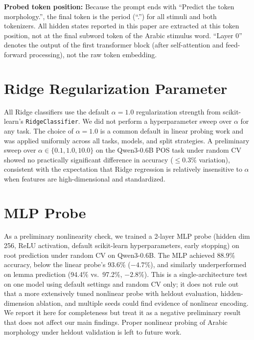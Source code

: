 \documentclass[11pt,a4paper]{article}
\begin{document}
\textbf{Probed token position:} Because the prompt ends with ``Predict the token morphology.'', the final token is the period (``.'') for all stimuli and both tokenizers. All hidden states reported in this paper are extracted at this token position, not at the final subword token of the Arabic stimulus word. ``Layer 0'' denotes the output of the first transformer block (after self-attention and feed-forward processing), not the raw token embedding.

\section{Ridge Regularization Parameter}\label{sec:appendix-alpha}
All Ridge classifiers use the default $\alpha=1.0$ regularization strength from scikit-learn's \texttt{RidgeClassifier}. We did not perform a hyperparameter sweep over $\alpha$ for any task. The choice of $\alpha=1.0$ is a common default in linear probing work and was applied uniformly across all tasks, models, and split strategies. A preliminary sweep over $\alpha \in \{0.1, 1.0, 10.0\}$ on the Qwen3-0.6B POS task under random CV showed no practically significant difference in accuracy ($\leq 0.3\%$ variation), consistent with the expectation that Ridge regression is relatively insensitive to $\alpha$ when features are high-dimensional and standardized.

\section{MLP Probe}\label{sec:appendix-mlp}
As a preliminary nonlinearity check, we trained a 2-layer MLP probe (hidden dim 256, ReLU activation, default scikit-learn hyperparameters, early stopping) on root prediction under random CV on Qwen3-0.6B. The MLP achieved 88.9\% accuracy, below the linear probe's 93.6\% ($-4.7\%$), and similarly underperformed on lemma prediction (94.4\% vs.\ 97.2\%, $-2.8\%$). This is a single-architecture test on one model using default settings and random CV only; it does not rule out that a more extensively tuned nonlinear probe with heldout evaluation, hidden-dimension ablation, and multiple seeds could find evidence of nonlinear encoding. We report it here for completeness but treat it as a negative preliminary result that does not affect our main findings. Proper nonlinear probing of Arabic morphology under heldout validation is left to future work.



\end{document}
